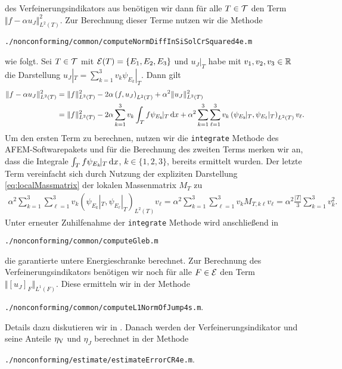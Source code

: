 des Verfeinerungsindikators aus  benötigen wir
dann für alle $T\in\mathcal{T}$ den Term $\Vert f-\alpha u_J\Vert_{L^2(T)}^2$.
Zur Berechnung dieser Terme nutzen wir die Methode
\begin{center}
  \texttt{./nonconforming/common/computeNormDiffInSiSolCrSquared4e.m}
\end{center}
wie folgt. 
Sei $T\in\mathcal{T}$ mit $\mathcal{E}(T)=\{E_1,E_2,E_3\}$ und $u_J|_T$ habe mit
$v_1,v_2,v_3\in\mathbb{R}$ die Darstellung $u_J|_T=\sum_{k=1}^3 v_k\psi_{E_k}\!|_T$.
Dann gilt
\begin{align*}
  \Vert f-\alpha u_J\Vert_{L^2(T)}^2 
  &=
  \Vert f\Vert_{L^2(T)}^2 - 2\alpha\left(f,u_J\right)_{L^2(T)} + \alpha^2 \Vert
  u_J\Vert_{L^2(T)}^2\\
  &=
  \Vert f\Vert_{L^2(T)}^2 
  - 2\alpha\sum_{k=1}^3 v_k\int_T f\psi_{E_k}\!|_T\,\mathrm{d}x
  + \alpha^2 \sum_{k=1}^3 \sum_{\ell=1}^3 
  v_k \left(\psi_{E_k}\!|_T,\psi_{E_\ell}|_T\right)_{L^2(T)}v_\ell.
\end{align*} 
Um den ersten Term zu berechnen, nutzen wir die \texttt{integrate} Methode des
AFEM-Soft\-ware\-pakets und für die Berechnung des zweiten Terms merken wir an,
dass die Integrale $\int_T f\psi_{E_k}\!|_T\,\mathrm{d}x$, $k\in\{1,2,3\}$, bereits
ermittelt wurden.
Der letzte Term vereinfacht sich durch Nutzung der expliziten Darstellung
\eqref{eq:localMassmatrix} der lokalen Massenmatrix $M_T$ zu
\begin{align*}
  \alpha^2 \sum_{k=1}^3 \sum_{\ell=1}^3 
    v_k \left(\psi_{E_k}\!|_T,\psi_{E_\ell}|_T\right)_{L^2(T)}v_\ell
  =
  \alpha^2 \sum_{k=1}^3 \sum_{\ell=1}^3 
  v_k M_{T,k\ell} v_\ell
  =
  \alpha^2\frac{|T|}{3}\sum_{k=1}^3 v_k^2.
\end{align*}
Unter erneuter Zuhilfenahme der \texttt{integrate} Methode wird anschließend
in
\begin{center}
  \texttt{./nonconforming/common/computeGleb.m}
\end{center}
die garantierte untere Energieschranke berechnet. 
Zur Berechnung des Verfeinerungsindikators benötigen wir noch
für alle $F\in\mathcal{E}$ den Term $\Vert[u_J]_F\Vert_{L^1(F)}$. Diese ermitteln wir
in der Methode 
\begin{center}
  \texttt{./nonconforming/common/computeL1NormOfJump4s.m}.
\end{center} 
Details dazu diskutieren wir in .
Danach werden der Verfeinerungsindikator
und seine Anteile $\eta_\textup{V}$ und $\eta_J$ berechnet in der Methode
\begin{center}
  \texttt{./nonconforming/estimate/estimateErrorCR4e.m}.
\end{center}
